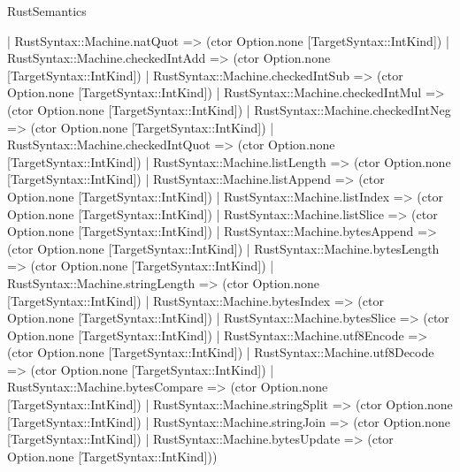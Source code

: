 \begin{lexlean}{RustSemantics}
\begin{semanticmodule}
{    | RustSyntax::Machine.natQuot => (ctor Option.none [TargetSyntax::IntKind])
    | RustSyntax::Machine.checkedIntAdd => (ctor Option.none [TargetSyntax::IntKind])
    | RustSyntax::Machine.checkedIntSub => (ctor Option.none [TargetSyntax::IntKind])
    | RustSyntax::Machine.checkedIntMul => (ctor Option.none [TargetSyntax::IntKind])
    | RustSyntax::Machine.checkedIntNeg => (ctor Option.none [TargetSyntax::IntKind])
    | RustSyntax::Machine.checkedIntQuot => (ctor Option.none [TargetSyntax::IntKind])
    | RustSyntax::Machine.listLength => (ctor Option.none [TargetSyntax::IntKind])
    | RustSyntax::Machine.listAppend => (ctor Option.none [TargetSyntax::IntKind])
    | RustSyntax::Machine.listIndex => (ctor Option.none [TargetSyntax::IntKind])
    | RustSyntax::Machine.listSlice => (ctor Option.none [TargetSyntax::IntKind])
    | RustSyntax::Machine.bytesAppend => (ctor Option.none [TargetSyntax::IntKind])
    | RustSyntax::Machine.bytesLength => (ctor Option.none [TargetSyntax::IntKind])
    | RustSyntax::Machine.stringLength => (ctor Option.none [TargetSyntax::IntKind])
    | RustSyntax::Machine.bytesIndex => (ctor Option.none [TargetSyntax::IntKind])
    | RustSyntax::Machine.bytesSlice => (ctor Option.none [TargetSyntax::IntKind])
    | RustSyntax::Machine.utf8Encode => (ctor Option.none [TargetSyntax::IntKind])
    | RustSyntax::Machine.utf8Decode => (ctor Option.none [TargetSyntax::IntKind])
    | RustSyntax::Machine.bytesCompare => (ctor Option.none [TargetSyntax::IntKind])
    | RustSyntax::Machine.stringSplit => (ctor Option.none [TargetSyntax::IntKind])
    | RustSyntax::Machine.stringJoin => (ctor Option.none [TargetSyntax::IntKind])
    | RustSyntax::Machine.bytesUpdate => (ctor Option.none [TargetSyntax::IntKind]))
}


\end{semanticmodule}
\end{lexlean}
